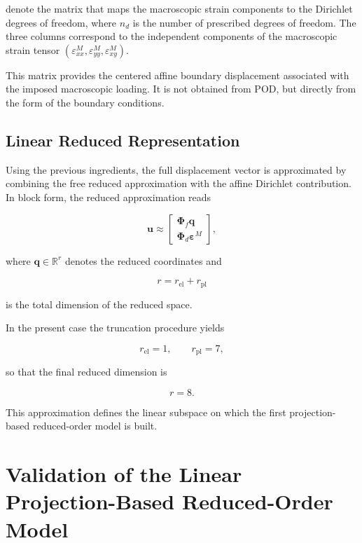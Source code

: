 \documentclass[11pt,a4paper]{article}
\begin{document}
denote the matrix that maps the macroscopic strain components to the Dirichlet degrees of freedom, where $n_d$ is the number of prescribed degrees of freedom. The three columns correspond to the independent components of the macroscopic strain tensor $(\varepsilon_{xx}^M,\varepsilon_{yy}^M,\varepsilon_{xy}^M)$.

This matrix provides the centered affine boundary displacement associated with the imposed macroscopic loading. It is not obtained from POD, but directly from the form of the boundary conditions.

\subsection{Linear Reduced Representation}

Using the previous ingredients, the full displacement vector is approximated by combining the free reduced approximation with the affine Dirichlet contribution. In block form, the reduced approximation reads

\begin{equation}
\mathbf{u}
\approx
\begin{bmatrix}
\mathbf{\Phi}_f \mathbf{q} \\
\mathbf{\Phi}_d \boldsymbol{\varepsilon}^{M}
\end{bmatrix},
\end{equation}

where $\mathbf{q} \in \mathbb{R}^{r}$ denotes the reduced coordinates and

\begin{equation}
r = r_{\mathrm{el}} + r_{\mathrm{pl}}
\end{equation}

is the total dimension of the reduced space.

In the present case the truncation procedure yields

\begin{equation}
r_{\mathrm{el}} = 1,
\qquad
r_{\mathrm{pl}} = 7,
\end{equation}

so that the final reduced dimension is

\begin{equation}
r = 8 .
\end{equation}

This approximation defines the linear subspace on which the first projection-based reduced-order model is built.

\section{Validation of the Linear Projection-Based Reduced-Order Model}
\end{document}
